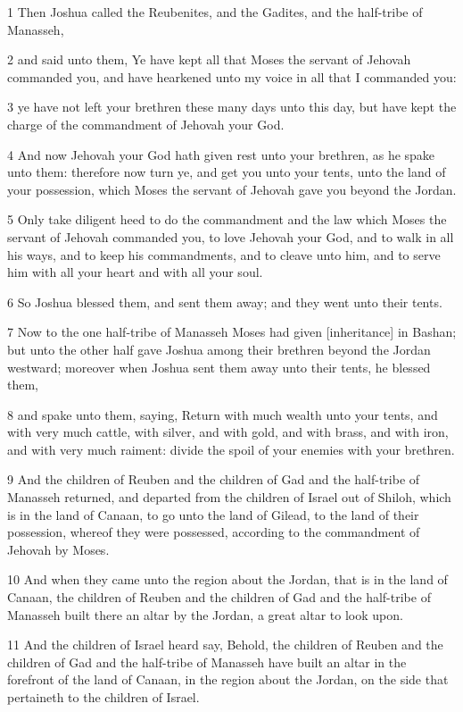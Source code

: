 \par 1 Then Joshua called the Reubenites, and the Gadites, and the half-tribe of Manasseh,
\par 2 and said unto them, Ye have kept all that Moses the servant of Jehovah commanded you, and have hearkened unto my voice in all that I commanded you:
\par 3 ye have not left your brethren these many days unto this day, but have kept the charge of the commandment of Jehovah your God.
\par 4 And now Jehovah your God hath given rest unto your brethren, as he spake unto them: therefore now turn ye, and get you unto your tents, unto the land of your possession, which Moses the servant of Jehovah gave you beyond the Jordan.
\par 5 Only take diligent heed to do the commandment and the law which Moses the servant of Jehovah commanded you, to love Jehovah your God, and to walk in all his ways, and to keep his commandments, and to cleave unto him, and to serve him with all your heart and with all your soul.
\par 6 So Joshua blessed them, and sent them away; and they went unto their tents.
\par 7 Now to the one half-tribe of Manasseh Moses had given [inheritance] in Bashan; but unto the other half gave Joshua among their brethren beyond the Jordan westward; moreover when Joshua sent them away unto their tents, he blessed them,
\par 8 and spake unto them, saying, Return with much wealth unto your tents, and with very much cattle, with silver, and with gold, and with brass, and with iron, and with very much raiment: divide the spoil of your enemies with your brethren.
\par 9 And the children of Reuben and the children of Gad and the half-tribe of Manasseh returned, and departed from the children of Israel out of Shiloh, which is in the land of Canaan, to go unto the land of Gilead, to the land of their possession, whereof they were possessed, according to the commandment of Jehovah by Moses.
\par 10 And when they came unto the region about the Jordan, that is in the land of Canaan, the children of Reuben and the children of Gad and the half-tribe of Manasseh built there an altar by the Jordan, a great altar to look upon.
\par 11 And the children of Israel heard say, Behold, the children of Reuben and the children of Gad and the half-tribe of Manasseh have built an altar in the forefront of the land of Canaan, in the region about the Jordan, on the side that pertaineth to the children of Israel.

